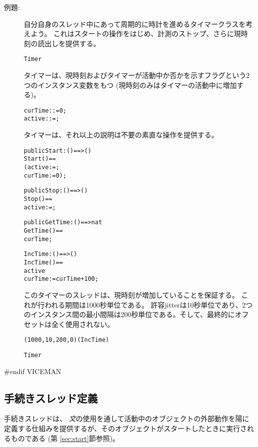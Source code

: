 \documentclass[\pformat,12pt]{jarticle}
\begin{document}
\begin{description}
\item[例題:]
自分自身のスレッド中にあって周期的に時計を進めるタイマークラスを考えよう。 
これはスタートの操作をはじめ、計測のストップ、さらに現時刻の読出しを提供する。

\begin{alltt}
   Timer
\end{alltt}

タイマーは、現時刻およびタイマーが活動中か否かを示すフラグという2つのインスタンス変数をもつ (現時刻のみはタイマーの活動中に増加する)。
\begin{alltt}
  curTime :  := 0;
  active  :  := ;
\end{alltt}

タイマーは、それ以上の説明は不要の素直な操作を提供する。
\begin{alltt}
  public Start : () ==> ()
  Start() ==
    (active := ;
     curTime := 0);

  public Stop : () ==> () 
  Stop() ==
    active := ;

  public GetTime : () ==> nat
  GetTime() ==
     curTime;

  IncTime: () ==> ()
  IncTime() ==
     active
     curTime := curTime + 100;
\end{alltt}

このタイマーのスレッドは、現時刻が増加していることを保証する。 これが行われる期間は1000秒単位である。
許容jitterは10秒単位であり、2つのインスタンス間の最小間隔は200秒単位である。そして、最終的にオフセットは全く使用されない。

\begin{alltt}
  (1000,10,200,0)(IncTime)

 Timer
\end{alltt}

\end{description}
#endif VICEMAN

\subsection{手続きスレッド定義}\label{se:proc-thread}

手続きスレッドは、 {\em 文}の使用を通して活動中のオブジェクトの外部動作を陽に定義する仕組みを提供するが、そのオブジェクトがスタートしたときに実行されるものである (第 \ref{sec:start}節参照)。  
\end{document}
